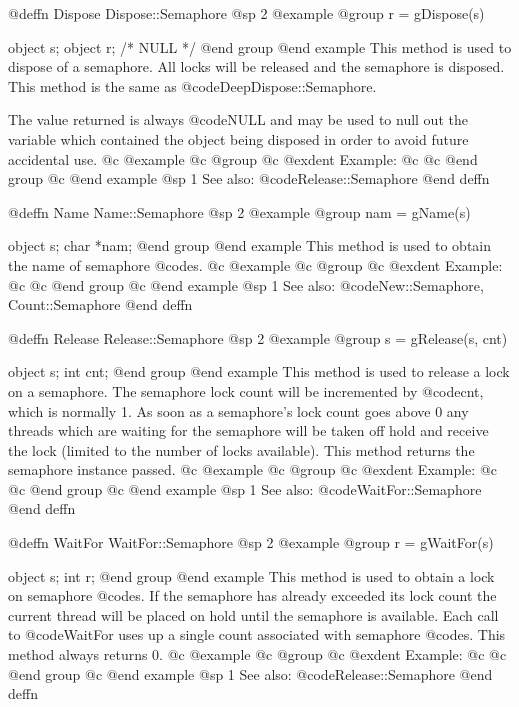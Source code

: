 @deffn {Dispose} Dispose::Semaphore
@sp 2
@example
@group
r = gDispose(s)

object  s;
object  r;     /*  NULL  */
@end group
@end example
This method is used to dispose of a semaphore.  All locks will be released
and the semaphore is disposed.  This method is the same as
@code{DeepDispose::Semaphore}.

The value returned is always @code{NULL} and may be used to null out
the variable which contained the object being disposed in order to
avoid future accidental use.
@c @example
@c @group
@c @exdent Example:
@c 
@c @end group
@c @end example
@sp 1
See also:  @code{Release::Semaphore}
@end deffn










@deffn {Name} Name::Semaphore
@sp 2
@example
@group
nam = gName(s)

object  s;
char    *nam;
@end group
@end example
This method is used to obtain the name of semaphore @code{s}.
@c @example
@c @group
@c @exdent Example:
@c 
@c @end group
@c @end example
@sp 1
See also:  @code{New::Semaphore, Count::Semaphore}
@end deffn








@deffn {Release} Release::Semaphore
@sp 2
@example
@group
s = gRelease(s, cnt)

object  s;
int     cnt;
@end group
@end example
This method is used to release a lock on a semaphore.  The semaphore
lock count will be incremented by @code{cnt}, which is normally 1.
As soon as a semaphore's lock count goes above 0 any threads which
are waiting for the semaphore will be taken off hold and receive
the lock (limited to the number of locks available).  This method
returns the semaphore instance passed.
@c @example
@c @group
@c @exdent Example:
@c 
@c @end group
@c @end example
@sp 1
See also:  @code{WaitFor::Semaphore}
@end deffn










@deffn {WaitFor} WaitFor::Semaphore
@sp 2
@example
@group
r = gWaitFor(s)

object  s;
int     r;
@end group
@end example
This method is used to obtain a lock on semaphore @code{s}.  If the
semaphore has already exceeded its lock count the current thread
will be placed on hold until the semaphore is available.  Each call
to @code{WaitFor} uses up a single count associated with semaphore
@code{s}.  This method always returns 0.
@c @example
@c @group
@c @exdent Example:
@c 
@c @end group
@c @end example
@sp 1
See also:  @code{Release::Semaphore}
@end deffn





